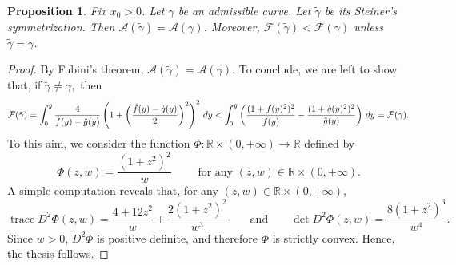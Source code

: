 \documentclass[11pt]{amsart}
\newcommand{\A}{\mathcal A}
\newcommand{\F}{\mathcal F}
\newcommand{\rr}{{\mathbb{R}}}
\DeclareMathOperator{\trace}{trace}
\newtheorem{proposition}[theorem]{Proposition}
\theoremstyle{definition}
\theoremstyle{remark}
\numberwithin{equation}{section}
\begin{document}
	\begin{proposition}
		Fix $x_0>0$. Let $\gamma$ be an admissible curve. Let $\tilde\gamma$ be its Steiner's symmetrization. Then $\A(\tilde\gamma)=\A(\gamma)$. Moreover, $\F(\tilde \gamma)< \F(\gamma)$ unless $\tilde \gamma=\gamma$.
	\end{proposition}
	\begin{proof}
		By Fubini's theorem, $\A(\tilde\gamma)=\A(\gamma)$. To conclude, we are left to show that, if $\tilde \gamma\neq \gamma,$ then
		\begin{equation*}
			\F(\tilde\gamma)=\int_0^{\bar y}\frac{4}{\Ddot f(y)-\Ddot g(y)}\left(1+\left(\frac{\Dot f(y)-\Dot g(y)}{2}\right)^2\right)^2\,d y<   \int_0^{\bar y}\left(\frac{(1+\Dot f(y)^2)^2}{\Ddot f(y)}-\frac{(1+\Dot g(y)^2)^2}{\Ddot g(y)}\right)\,dy=\F(\gamma).
		\end{equation*}
		To this aim, we consider the function $\Phi:\rr\times(0,+\infty)\longrightarrow\rr$ defined by
		\begin{equation*}
			\Phi(z,w)=\frac{(1+z^2)^2}{w}\qquad\text{ for any $(z,w)\in\rr\times(0,+\infty)$.}
		\end{equation*}
		A simple computation reveals that, for any $(z,w)\in \rr\times(0,+\infty)$, 
		\begin{equation*}
			\trace D^2\Phi(z,w)=\frac{4+12z^2}{w}+\frac{2(1+z^2)^2}{w^3}\qquad\text{and}\qquad\det D^2\Phi(z,w)=\frac{8(1+z^2)^3}{w^4}.
		\end{equation*}
		Since $w>0$, $D^2\Phi$ is positive definite, and therefore $\Phi$ is strictly convex. Hence, the thesis follows.
	\end{proof}
\end{document}
